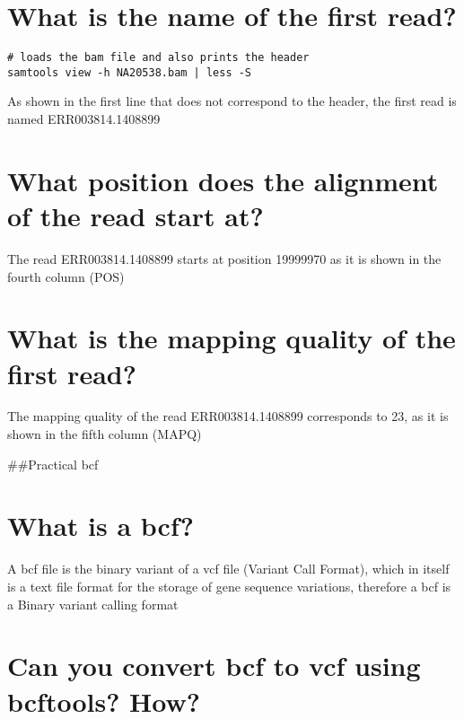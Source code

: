 \documentclass[
]{article}
\begin{document}
\hypertarget{what-is-the-name-of-the-first-read}{%
\section{What is the name of the first
read?}\label{what-is-the-name-of-the-first-read}}

\begin{verbatim}
# loads the bam file and also prints the header
samtools view -h NA20538.bam | less -S
\end{verbatim}

As shown in the first line that does not correspond to the header, the
first read is named ERR003814.1408899

\hypertarget{what-position-does-the-alignment-of-the-read-start-at}{%
\section{What position does the alignment of the read start
at?}\label{what-position-does-the-alignment-of-the-read-start-at}}

The read ERR003814.1408899 starts at position 19999970 as it is shown in
the fourth column (POS)

\hypertarget{what-is-the-mapping-quality-of-the-first-read}{%
\section{What is the mapping quality of the first
read?}\label{what-is-the-mapping-quality-of-the-first-read}}

The mapping quality of the read ERR003814.1408899 corresponds to 23, as
it is shown in the fifth column (MAPQ)

\#\#Practical bcf

\hypertarget{what-is-a-bcf}{%
\section{What is a bcf?}\label{what-is-a-bcf}}

A bcf file is the binary variant of a vcf file (Variant Call Format),
which in itself is a text file format for the storage of gene sequence
variations, therefore a bcf is a Binary variant calling format

\hypertarget{can-you-convert-bcf-to-vcf-using-bcftools-how}{%
\section{Can you convert bcf to vcf using bcftools?
How?}\label{can-you-convert-bcf-to-vcf-using-bcftools-how}}
\end{document}
